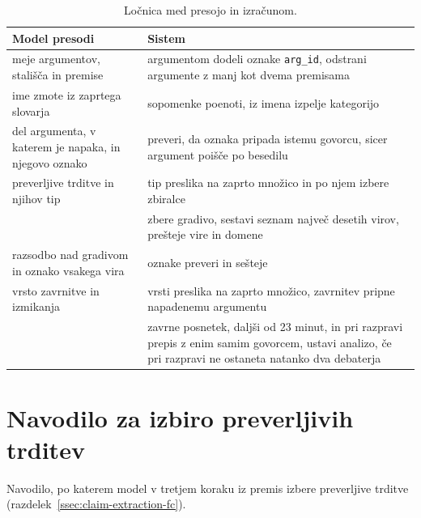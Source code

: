 \documentclass[a4paper, 12pt]{book}
\begin{document}
\begin{table}[htbp]
\centering
\small
{}
\begin{tabular}{@{}p{} | p{}@{}}
\toprule
Model presodi & Sistem \\
\midrule
meje argumentov, stališča in premise & argumentom dodeli oznake \texttt{arg\_id}, odstrani argumente z manj kot dvema premisama \\
\midrule
ime zmote iz zaprtega slovarja & sopomenke poenoti, iz imena izpelje kategorijo \\
\midrule
del argumenta, v katerem je napaka, in njegovo oznako & preveri, da oznaka pripada istemu govorcu, sicer argument poišče po besedilu \\
\midrule
preverljive trditve in njihov tip & tip preslika na zaprto množico in po njem izbere zbiralce \\
\midrule
 & zbere gradivo, sestavi seznam največ desetih virov, prešteje vire in domene \\
\midrule
razsodbo nad gradivom in oznako vsakega vira & oznake preveri in sešteje \\
\midrule
vrsto zavrnitve in izmikanja & vrsti preslika na zaprto množico, zavrnitev pripne napadenemu argumentu \\
\midrule
 & zavrne posnetek, daljši od 23 minut, in pri razpravi prepis z enim samim govorcem, ustavi analizo, če pri razpravi ne ostaneta natanko dva debaterja \\
\bottomrule
\end{tabular}
\caption{Ločnica med presojo in izračunom.}
\label{tbl:locnica}
\end{table}

\chapter{Navodilo za izbiro preverljivih trditev}
\label{app:izbira-trditev}

Navodilo, po katerem model v tretjem koraku iz premis izbere preverljive trditve (razdelek~\ref{ssec:claim-extraction-fc}).
\end{document}
